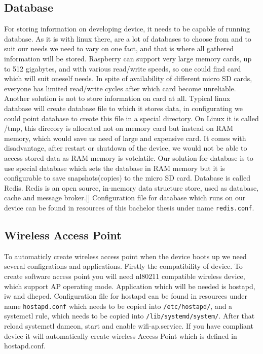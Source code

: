 \subsection{Database} %
\label{sub:database}
For storing information on developing device, it needs to be capable of running database. As it is with linux there, are a lot of databases to choose from and to suit our needs we need to vary on one fact, and that is where all gathered information will be stored. Raspberry can support very large memory cards, up to 512 gigabytes, and with various read/write speeds, so one could find card which will suit oneself needs.\cite{rpi_sd_cards} In spite of availability of different micro SD cards, everyone has limited read/write cycles after which card become unreliable. Another solution is not to store information on card at all. Typical linux database will create database file to which it stores data, in configurating we could point database to create this file in a special directory. On Linux it is called /tmp\cite{tmp}, this direcory is allocated not on memory card but instead on RAM memory, which would save us need of large and expensive card. It comes with disadvantage, after restart or shutdown of the device, we would not be able to access stored data as RAM memory is votelatile\cite{tmpfs}.
Our solution for database is to use special database which sets the database in RAM memory but it is configurable to save snapshots(copies) to the micro SD card. Database is called Redis. Redis is an open source, in-memory data structure store, used as database, cache and message broker.[\cite{redis_doc}] Configuration file for database which runs on our device can be found in resources of this bachelor thesis under name \verb|redis.conf|.
\subsection{Wireless Access Point} %
\label{sub:wireless_access_point}
To automaticly create wireless access point when the device boots up we need several configrations and applications. Firstly the compatibility of device. To create software access point you will need nl80211 compatible wireless device, which support AP operating mode\cite{soft_ap}. Application which will be needed is hostapd, iw and dhcpcd. Configuration file for hostapd can be found in resources under name \verb|hostapd.conf| which needs to be copied into \verb|/etc/hostapd/|, and a systemctl rule, which needs to be copied into \verb|/lib/systemd/system/|. After that reload systemctl dameon, start and enable wifi-ap.service. If you have compliant device it will automatically create wireless Access Point which is defined in hostapd.conf.
